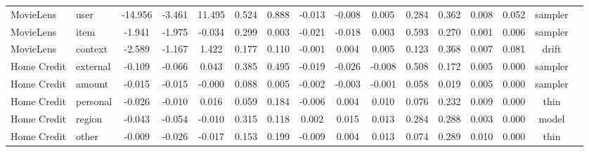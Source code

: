 \begin{table}[t]
{\begin{tabular}{llcccccccccccccc}
MovieLens & user & -14.956 & -3.461 & 11.495 & 0.524 & 0.888 & -0.013 & -0.008 & 0.005 & 0.284 & 0.362 & 0.008 & 0.052 & sampler \\
MovieLens & item & -1.941 & -1.975 & -0.034 & 0.299 & 0.003 & -0.021 & -0.018 & 0.003 & 0.593 & 0.270 & 0.001 & 0.006 & sampler \\
MovieLens & context & -2.589 & -1.167 & 1.422 & 0.177 & 0.110 & -0.001 & 0.004 & 0.005 & 0.123 & 0.368 & 0.007 & 0.081 & drift \\
Home Credit & external & -0.109 & -0.066 & 0.043 & 0.385 & 0.495 & -0.019 & -0.026 & -0.008 & 0.508 & 0.172 & 0.005 & 0.000 & sampler \\
Home Credit & amount & -0.015 & -0.015 & -0.000 & 0.088 & 0.005 & -0.002 & -0.003 & -0.001 & 0.058 & 0.019 & 0.005 & 0.000 & sampler \\
Home Credit & personal & -0.026 & -0.010 & 0.016 & 0.059 & 0.184 & -0.006 & 0.004 & 0.010 & 0.076 & 0.232 & 0.009 & 0.000 & thin \\
Home Credit & region & -0.043 & -0.054 & -0.010 & 0.315 & 0.118 & 0.002 & 0.015 & 0.013 & 0.284 & 0.288 & 0.003 & 0.000 & model \\
Home Credit & other & -0.009 & -0.026 & -0.017 & 0.153 & 0.199 & -0.009 & 0.004 & 0.013 & 0.074 & 0.289 & 0.010 & 0.000 & thin \\
\bottomrule
\end{tabular}}
\end{table}
